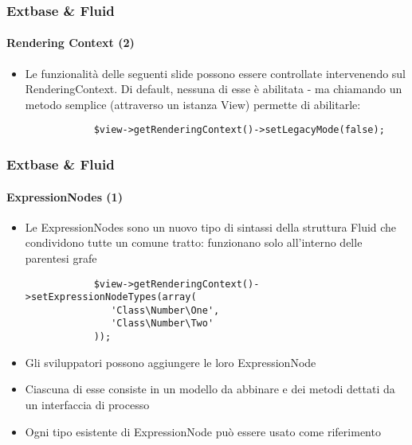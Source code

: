 \begin{frame}[fragile]
	\frametitle{Extbase \& Fluid}
	\framesubtitle{Rendering Context (2)}

	\lstset{basicstyle=\smaller\ttfamily}

	\begin{itemize}

		\item Le funzionalità delle seguenti slide possono essere controllate intervenendo
			sul RenderingContext. Di default, nessuna di esse è abilitata - ma chiamando
			un metodo semplice (attraverso un istanza View) permette di abilitarle:

		\begin{lstlisting}
			$view->getRenderingContext()->setLegacyMode(false);
		\end{lstlisting}

	\end{itemize}

\end{frame}


\begin{frame}[fragile]
	\frametitle{Extbase \& Fluid}
	\framesubtitle{ExpressionNodes (1)}

	\lstset{basicstyle=\smaller\ttfamily}

	\begin{itemize}

		\item Le ExpressionNodes sono un nuovo tipo di sintassi della struttura Fluid che condividono
			tutte un comune tratto: funzionano solo all'interno delle parentesi grafe

		\begin{lstlisting}
			$view->getRenderingContext()->setExpressionNodeTypes(array(
			   'Class\Number\One',
			   'Class\Number\Two'
			));
		\end{lstlisting}

		\item Gli sviluppatori possono aggiungere le loro ExpressionNode

		\item Ciascuna di esse consiste in un modello da abbinare e dei metodi dettati da
			un interfaccia di processo

		\item Ogni tipo esistente di ExpressionNode può essere usato come riferimento

	\end{itemize}

\end{frame}

